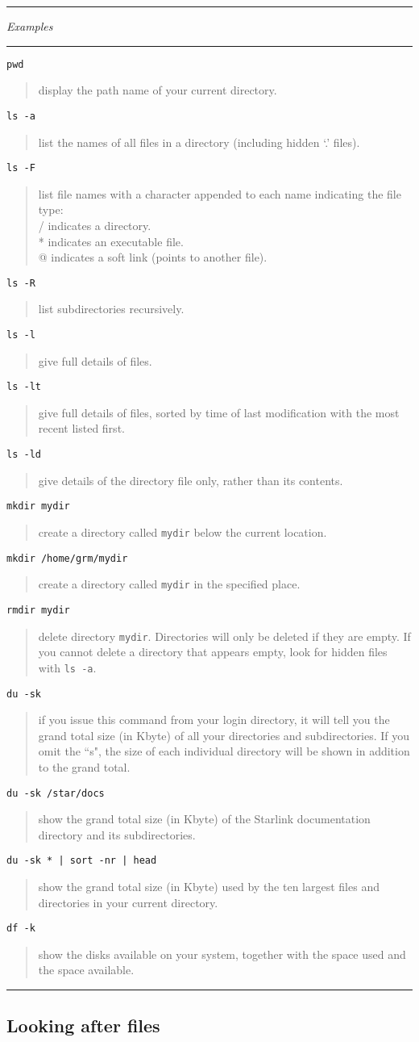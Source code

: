 \documentclass[twoside,11pt]{article}
\newcommand{\example}[2]{\goodbreak
                         {\tt #1}
                         \vspace*{-4mm}
                         \begin{quote}
                           {\small #2}
                         \end{quote}
                        }
\newcommand{\example}[2]{\goodbreak
                            {\tt #1}
                            \vspace*{-4mm}
                            \begin{quote}
                            {#2}
                            \end{quote}
                           }
\newcommand{\exbegin}{\begin{center}
                      \rule{18mm}{0.3mm}
                      {\em Examples}
                      \rule{18mm}{0.3mm}
                      \end{center}
                     }
\newcommand{\exend}{\begin{center}
                    \rule{50mm}{0.3mm}
                    \end{center}
                   }
\begin{document}
\goodbreak

\exbegin

\example{pwd}
{display the path name of your current directory.}

\example{ls -a}
{list the names of all files in a directory (including hidden `.' files).}

\example{ls -F}
{list file names with a character appended to each name indicating
  the file type: \\
  /  indicates a directory.\\
  {*} indicates an executable file.\\
  @ indicates a soft link (points to another file).}

\example{ls -R}
{list subdirectories recursively.}

\example{ls -l}
{give full details of files.}

\example{ls -lt}
{give full details of files, sorted by time of last modification with the most
recent listed first.}

\example{ls -ld}
{give details of the directory file only, rather than its contents.}

\example{mkdir mydir}
{create a directory called {\tt mydir} below the current location.}

\example{mkdir /home/grm/mydir}
{create a directory called {\tt mydir} in the specified place.}

\example{rmdir mydir}
{delete directory {\tt mydir}. Directories will only be deleted if they are
empty.
If you cannot delete a directory that appears empty, look for hidden files
with {\tt ls -a}.}

\example{du -sk}
{if you issue this command from your login directory, it will tell you the
grand total size (in Kbyte) of all your directories and subdirectories.
If you omit the ``s", the size of each individual directory will be shown
in addition to the grand total.}

\example{du -sk /star/docs}
{show the grand total size (in Kbyte) of the Starlink documentation directory
and its subdirectories.}

\example{du -sk * | sort -nr | head}
{show the grand total size (in Kbyte) used by the ten largest files
and directories in your current directory.}

\example{df -k}
{show the disks available on your system, together with the space used and the
space available.}

\exend

\subsection{Looking after files}
\end{document}
